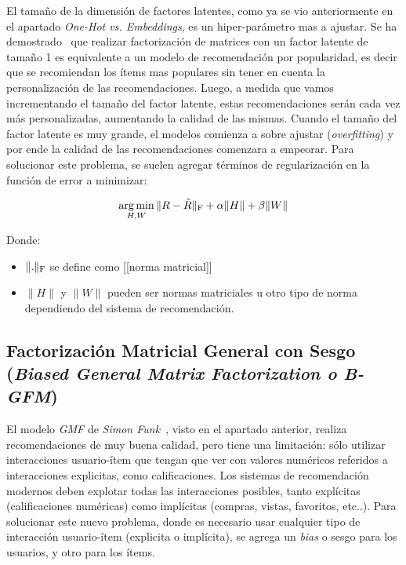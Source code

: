 \documentclass[11pt,a4paper,twoside]{thesis}
\begin{document}
El tamaño de la dimensión de factores latentes, como ya se vio anteriormente en
el apartado \textit{One-Hot vs. Embeddings}, es un hiper-parámetro mas a
ajustar. Se ha demostrado~\cite{embeddingsizedem} que realizar factorización de
matrices con un factor latente de tamaño 1 es equivalente a un modelo de
recomendación por popularidad, es decir que se recomiendan los ítems mas
populares sin tener en cuenta la personalización de las recomendaciones. Luego,
a medida que vamos incrementando el tamaño del factor latente, estas
recomendaciones serán cada vez más personalizadas, aumentando la calidad de las
mismas. Cuando el tamaño del factor latente es muy grande, el modelos comienza
a sobre ajustar (\textit{overfitting}) y por ende la calidad de las
recomendaciones comenzara a empeorar. Para solucionar este problema, se suelen
agregar términos de regularización en la función de error a minimizar:

\begin{equation}
	\underset{H, W}{\operatorname{arg\,min } }\, \|R - \tilde{R}\|_{\rm F} + \alpha\|H\| + \beta\|W\|
\end{equation}
\begin{description}
	\item[Donde:]
\end{description}
\begin{itemize}
	\item $\|.\|_{\rm F}$ se define como [[norma matricial]]
	\item $\|H\|$ y $\|W\|$ pueden ser normas matriciales u otro tipo de norma dependiendo del sistema de recomendación.
\end{itemize}

\subsection{Factorización Matricial General con Sesgo
	(\textit{Biased General Matrix Factorization o B-GFM})}

El modelo \textit{GMF} de \textit{Simon Funk}~\cite{afm, dlwkrs}, visto en el
apartado anterior, realiza recomendaciones de muy buena calidad, pero tiene una
limitación: sólo utilizar interacciones usuario-ítem que tengan que ver con
valores numéricos referidos a interacciones explicitas, como calificaciones.
Los sistemas de recomendación modernos deben explotar todas las interacciones
posibles, tanto explícitas (calificaciones numéricas) como implícitas (compras,
vistas, favoritos, etc..). Para solucionar este nuevo problema, donde es
necesario usar cualquier tipo de interacción usuario-ítem (explicita o
implícita), se agrega un \textit{bias} o sesgo para los usuarios, y otro para
los ítems.
\end{document}
